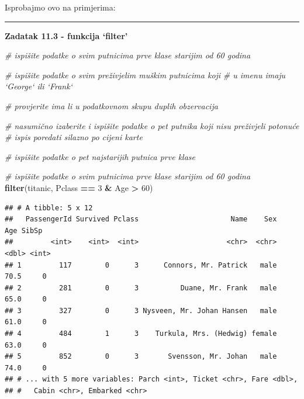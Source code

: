 \documentclass[]{book}
\newenvironment{Shaded}{\begin{snugshade}}{\end{snugshade}}
\newcommand{\KeywordTok}[1]{\textcolor[rgb]{0.13,0.29,0.53}{\textbf{#1}}}
\newcommand{\DecValTok}[1]{\textcolor[rgb]{0.00,0.00,0.81}{#1}}
\newcommand{\StringTok}[1]{\textcolor[rgb]{0.31,0.60,0.02}{#1}}
\newcommand{\CommentTok}[1]{\textcolor[rgb]{0.56,0.35,0.01}{\textit{#1}}}
\newcommand{\OperatorTok}[1]{\textcolor[rgb]{0.81,0.36,0.00}{\textbf{#1}}}
\newcommand{\NormalTok}[1]{#1}
\theoremstyle{definition}
\theoremstyle{definition}
\theoremstyle{definition}
\theoremstyle{remark}
\begin{document}
Isprobajmo ovo na primjerima:

\begin{center}\rule{0.5\linewidth}{\linethickness}\end{center}

\textbf{Zadatak 11.3 - funkcija `filter'}

\begin{Shaded}
\begin{Highlighting}[]
\CommentTok{# ispišite podatke o svim putnicima prve klase starijim od 60 godina}

\CommentTok{# ispišite podatke o svim preživjelim muškim putnicima koji }
\CommentTok{# u imenu imaju `George` ili `Frank`}

\CommentTok{# provjerite ima li u podatkovnom skupu duplih obzervacija}

\CommentTok{# nasumično izaberite i ispišite podatke o pet putnika koji nisu preživjeli potonuće}
\CommentTok{# ispis poredati silazno po cijeni karte}

\CommentTok{# ispišite podatke o pet najstarijih putnica prve klase }
\end{Highlighting}
\end{Shaded}

\begin{Shaded}
\begin{Highlighting}[]
\CommentTok{# ispišite podatke o svim putnicima prve klase starijim od 60 godina}
\KeywordTok{filter}\NormalTok{(titanic, Pclass }\OperatorTok{==}\StringTok{ }\DecValTok{3} \OperatorTok{&}\StringTok{ }\NormalTok{Age }\OperatorTok{>}\StringTok{ }\DecValTok{60}\NormalTok{)}
\end{Highlighting}
\end{Shaded}

\begin{verbatim}
## # A tibble: 5 x 12
##   PassengerId Survived Pclass                      Name    Sex   Age SibSp
##         <int>    <int>  <int>                     <chr>  <chr> <dbl> <int>
## 1         117        0      3      Connors, Mr. Patrick   male  70.5     0
## 2         281        0      3          Duane, Mr. Frank   male  65.0     0
## 3         327        0      3 Nysveen, Mr. Johan Hansen   male  61.0     0
## 4         484        1      3    Turkula, Mrs. (Hedwig) female  63.0     0
## 5         852        0      3       Svensson, Mr. Johan   male  74.0     0
## # ... with 5 more variables: Parch <int>, Ticket <chr>, Fare <dbl>,
## #   Cabin <chr>, Embarked <chr>
\end{verbatim}
\end{document}
